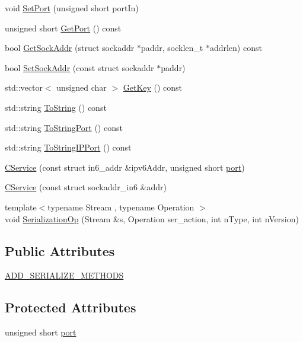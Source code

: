 \begin{DoxyCompactItemize}
\item 
void \hyperlink{class_c_service_a3dedc3f12aa21bdbf1068b054d3e3d39}{Set\+Port} (unsigned short port\+In)
\item 
unsigned short \hyperlink{class_c_service_a49df6ecaf59be814632c4d7755f26637}{Get\+Port} () const 
\item 
bool \hyperlink{class_c_service_ab0f791c174511056236119cc1580faeb}{Get\+Sock\+Addr} (struct sockaddr $\ast$paddr, socklen\+\_\+t $\ast$addrlen) const 
\item 
bool \hyperlink{class_c_service_a77782219f5d85f326b4c089cb2636e6f}{Set\+Sock\+Addr} (const struct sockaddr $\ast$paddr)
\item 
std\+::vector$<$ unsigned char $>$ \hyperlink{class_c_service_a74d6e1526688229cb424584c29046e9e}{Get\+Key} () const 
\item 
std\+::string \hyperlink{class_c_service_a336f9848fe9364e260c76499be0351a5}{To\+String} () const 
\item 
std\+::string \hyperlink{class_c_service_a1e0f0b98239a9097044695a9e439bb46}{To\+String\+Port} () const 
\item 
std\+::string \hyperlink{class_c_service_a39b82301356b0dfc2a92befc727b77be}{To\+String\+I\+P\+Port} () const 
\item 
\hyperlink{class_c_service_a92fd246e176f01266cb36beae0c8f4fe}{C\+Service} (const struct in6\+\_\+addr \&ipv6\+Addr, unsigned short \hyperlink{class_c_service_aef17734203dc2125cbdf4d23e50be410}{port})
\item 
\hyperlink{class_c_service_ac0eb3107507be78cc683e7a7fa8d56e4}{C\+Service} (const struct sockaddr\+\_\+in6 \&addr)
\item 
{\footnotesize template$<$typename Stream , typename Operation $>$ }\\void \hyperlink{class_c_service_a0673ebec7bdc8558ce3fe1d63ea4d2e1}{Serialization\+Op} (Stream \&s, Operation ser\+\_\+action, int n\+Type, int n\+Version)
\end{DoxyCompactItemize}
\subsection*{Public Attributes}
\begin{DoxyCompactItemize}
\item 
\hyperlink{class_c_service_a3347aa84bd8f98ae853307ad4e47a4f5}{A\+D\+D\+\_\+\+S\+E\+R\+I\+A\+L\+I\+Z\+E\+\_\+\+M\+E\+T\+H\+O\+D\+S}
\end{DoxyCompactItemize}
\subsection*{Protected Attributes}
\begin{DoxyCompactItemize}
\item 
unsigned short \hyperlink{class_c_service_aef17734203dc2125cbdf4d23e50be410}{port}
\end{DoxyCompactItemize}
